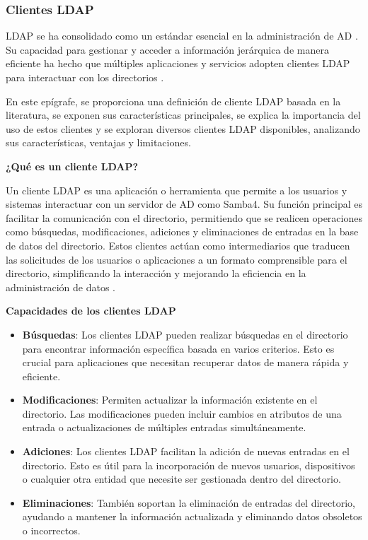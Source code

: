 \subsubsection{Clientes LDAP}

LDAP se ha consolidado como un estándar esencial en la administración de AD \autocite{janice_ldap_2023,carter_ldap_2003}. Su capacidad para gestionar y acceder a información jerárquica de manera eficiente ha hecho que múltiples aplicaciones y servicios adopten clientes LDAP para interactuar con los directorios \autocite{noauthor_integrate_nodate,noauthor_redmineldap_nodate,noauthor_user_nodate,noauthor_setting_nodate}.

En este epígrafe, se proporciona una definición de cliente LDAP basada en la literatura, se exponen sus características principales, se explica la importancia del uso de estos clientes y se exploran diversos clientes LDAP disponibles, analizando sus características, ventajas y limitaciones.

\textbf{¿Qué es un cliente LDAP?}

Un cliente LDAP es una aplicación o herramienta que permite a los usuarios y sistemas interactuar con un servidor de AD como Samba4. Su función principal es facilitar la comunicación con el directorio, permitiendo que se realicen operaciones como búsquedas, modificaciones, adiciones y eliminaciones de entradas en la base de datos del directorio. Estos clientes actúan como intermediarios que traducen las solicitudes de los usuarios o aplicaciones a un formato comprensible para el directorio, simplificando la interacción y mejorando la eficiencia en la administración de datos \autocite{howes_ldap_1997,carter_ldap_2003,voglmaier_abcs_2003,sermersheim_lightweight_2006}.

\textbf{Capacidades de los clientes LDAP}
\begin{itemize}
    \item \textbf{Búsquedas}: Los clientes LDAP pueden realizar búsquedas en el directorio para encontrar información específica basada en varios criterios. Esto es crucial para aplicaciones que necesitan recuperar datos de manera rápida y eficiente.
    \item \textbf{Modificaciones}: Permiten actualizar la información existente en el directorio. Las modificaciones pueden incluir cambios en atributos de una entrada o actualizaciones de múltiples entradas simultáneamente.
    \item \textbf{Adiciones}: Los clientes LDAP facilitan la adición de nuevas entradas en el directorio. Esto es útil para la incorporación de nuevos usuarios, dispositivos o cualquier otra entidad que necesite ser gestionada dentro del directorio.
    \item \textbf{Eliminaciones}: También soportan la eliminación de entradas del directorio, ayudando a mantener la información actualizada y eliminando datos obsoletos o incorrectos.
\end{itemize}

